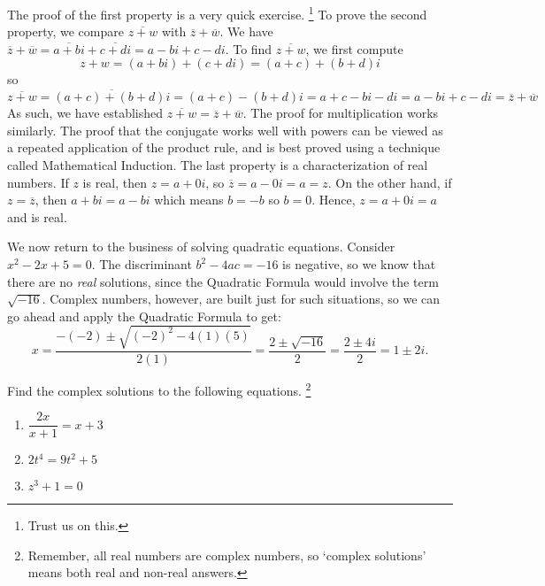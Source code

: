 \documentclass{ximera}
\begin{document}
The proof of the first property is a very quick exercise.%
\footnote{Trust us on this.}
To prove the second property, we compare $\overline{z+w}$ with $\overline{z} + \overline{w}$.  We have $\overline{z} + \overline{w} = \overline{a+bi} + \overline{c+di}  = a-bi + c-di$.  To find $\overline{z+w}$, we first compute 
\[
    z+w = (a+bi) + (c+di) = (a+c)+(b+d)i
\] 
so 
\[
    \overline{z+w} = \overline{(a+c)+(b+d)i} = (a+c) - (b+d)i = a+c - bi - di = a - bi + c - di = \overline{z} + \overline{w}
\]  
As such, we have established  $\overline{z+w} = \overline{z}+\overline{w}$. The proof for multiplication works similarly.  The proof that the conjugate works well with powers can be viewed as a repeated application of the product rule, and is best proved using a technique called Mathematical Induction.%
The last property is a characterization of real numbers.  If $z$ is real, then $z = a + 0i$, so $\overline{z} = a - 0i = a = z$.  On the other hand, if $z=\overline{z}$, then $a+bi = a - bi$ which means $b=-b$ so $b=0$.  Hence, $z = a +0i = a$ and is real.

We now return to the business of solving quadratic equations. Consider  $x^2-2x+5 = 0$. The discriminant $b^2 - 4ac = -16$ is negative, so we know %
that there are no \textit{real} solutions, since the Quadratic Formula would involve the term $\sqrt{-16}$.  Complex numbers, however, are built just for such situations, so we can go ahead and apply the Quadratic Formula to get: 
\[ 
    x = \dfrac{-(-2) \pm \sqrt{(-2)^2-4(1)(5)}}{2(1)} = \dfrac{2 \pm \sqrt{-16}}{2} = \dfrac{2 \pm 4i}{2} = 1 \pm 2i.
\]  

\begin{example} 
    \label{complexsolnsreviewex}  
    Find the complex solutions to the following equations.%
    \footnote{Remember, all real numbers are complex numbers, so `complex solutions' means both real and non-real answers.}
    \begin{multicols}{3}
        \begin{enumerate}
            \item  $\dfrac{2x}{x+1} = x+3$
            \item $2t^4 = 9t^2 + 5$
            \item  $z^3 + 1 = 0$
        \end{enumerate}
    \end{multicols}
\end{example}
\end{document}
